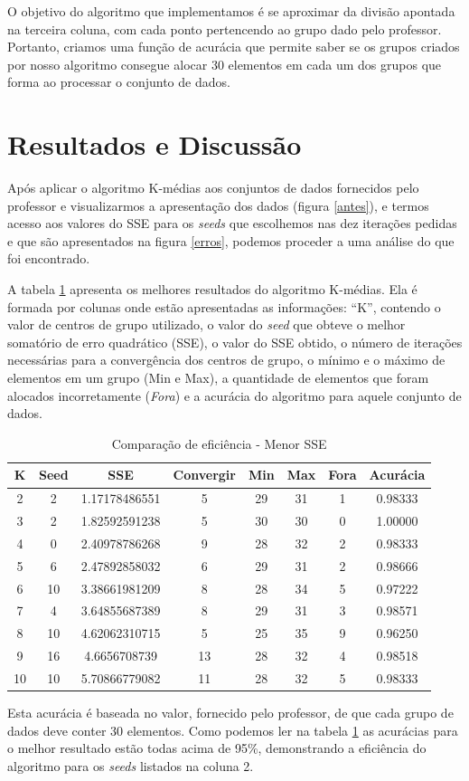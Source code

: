 \documentclass[12pt, a4paper]{article}
\begin{document}
O objetivo do algoritmo que implementamos é se aproximar da divisão apontada na terceira coluna, com cada ponto pertencendo ao grupo dado pelo professor. Portanto, criamos uma função de acurácia que permite saber se os grupos criados por nosso algoritmo consegue alocar 30 elementos em cada um dos grupos que forma ao processar o conjunto de dados.

\section{Resultados e Discussão}
\label{discussao}
Após aplicar o algoritmo K-médias aos conjuntos de dados fornecidos pelo professor e visualizarmos a apresentação dos dados (figura \ref{antes}), e termos acesso aos valores do SSE para os \textit{seeds} que escolhemos nas dez iterações pedidas e que são apresentados na figura \ref{erros}, podemos proceder a uma análise do que foi encontrado.

A tabela \ref{tabMelhor} apresenta os melhores resultados do algoritmo K-médias. Ela é formada por colunas onde estão apresentadas as informações: ``K'', contendo o valor de centros de grupo utilizado, o valor do \emph{seed} que obteve o melhor somatório de erro quadrático (SSE), o valor do SSE obtido, o número de iterações necessárias para a convergência dos centros de grupo, o mínimo e o máximo de elementos em um grupo (Min e Max), a quantidade de elementos que foram alocados incorretamente (\emph{Fora}) e a acurácia do algoritmo para aquele conjunto de dados.
\begin{table}[!ht]
	\centering
	\caption{Comparação de eficiência - Menor SSE}	
	\label{tabMelhor}
	\begin{tabular}{|c|c|c|c|c|c|c|c|}
	\hline
	K & Seed & SSE & Convergir & Min & Max & Fora & Acurácia\\
	\hline
	2 & 2 & 1.17178486551 & 5 & 29 & 31 & 1 & 0.98333 \\
	\hline
	3 & 2 & 1.82592591238 & 5 & 30 & 30 & 0 & 1.00000 \\
	\hline
	4 & 0 & 2.40978786268 & 9 & 28 & 32 & 2 & 0.98333\\
	\hline
	5 & 6 & 2.47892858032 & 6 & 29 & 31 & 2 & 0.98666\\
	\hline
	6 & 10 & 3.38661981209 & 8 & 28 & 34 & 5 & 0.97222\\
	\hline
	7 & 4 & 3.64855687389 & 8 & 29 & 31 & 3 & 0.98571\\
	\hline
	8 & 10 & 4.62062310715 & 5 & 25 & 35 & 9 & 0.96250\\ %
	\hline
	9 & 16 & 4.6656708739 & 13 & 28 & 32 & 4 & 0.98518\\
	\hline
	10 & 10 & 5.70866779082 & 11 & 28 & 32 & 5 & 0.98333\\
	\hline
	\end{tabular}
\end{table}
Esta acurácia é baseada no valor, fornecido pelo professor, de que cada grupo de dados deve conter 30 elementos. Como podemos ler na tabela \ref{tabMelhor} as acurácias para o melhor resultado estão todas acima de 95\%, demonstrando a eficiência do algoritmo para os \emph{seeds} listados na coluna 2.
\end{document}
